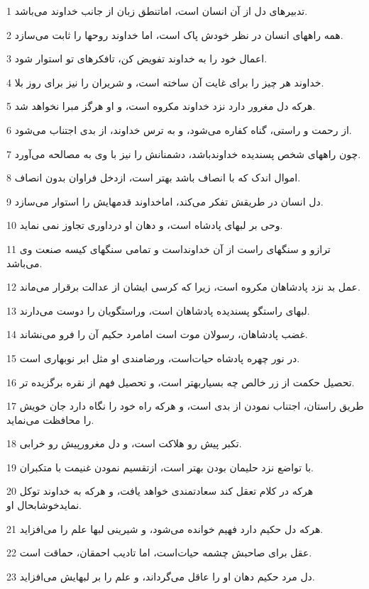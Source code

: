 \par 1 تدبیرهای دل از آن انسان است، اماتنطق زبان از جانب خداوند می‌باشد.
\par 2 همه راههای انسان در نظر خودش پاک است، اما خداوند روحها را ثابت می‌سازد.
\par 3 اعمال خود را به خداوند تفویض کن، تافکرهای تو استوار شود.
\par 4 خداوند هر چیز را برای غایت آن ساخته است، و شریران را نیز برای روز بلا.
\par 5 هر‌که دل مغرور دارد نزد خداوند مکروه است، و او هرگز مبرا نخواهد شد.
\par 6 از رحمت و راستی، گناه کفاره می‌شود، و به ترس خداوند، از بدی اجتناب می‌شود.
\par 7 چون راههای شخص پسندیده خداوندباشد، دشمنانش را نیز با وی به مصالحه می‌آورد.
\par 8 اموال اندک که با انصاف باشد بهتر است، ازدخل فراوان بدون انصاف.
\par 9 دل انسان در طریقش تفکر می‌کند، اماخداوند قدمهایش را استوار می‌سازد.
\par 10 وحی بر لبهای پادشاه است، و دهان او درداوری تجاوز نمی نماید.
\par 11 ترازو و سنگهای راست از آن خداونداست و تمامی سنگهای کیسه صنعت وی می‌باشد.
\par 12 عمل بد نزد پادشاهان مکروه است، زیرا که کرسی ایشان از عدالت برقرار می‌ماند.
\par 13 لبهای راستگو پسندیده پادشاهان است، وراستگویان را دوست می‌دارند.
\par 14 غضب پادشاهان، رسولان موت است امامرد حکیم آن را فرو می‌نشاند.
\par 15 در نور چهره پادشاه حیات‌است، ورضامندی او مثل ابر نوبهاری است.
\par 16 تحصیل حکمت از زر خالص چه بسیاربهتر است، و تحصیل فهم از نقره برگزیده تر.
\par 17 طریق راستان، اجتناب نمودن از بدی است، و هر‌که راه خود را نگاه دارد جان خویش را محافظت می‌نماید.
\par 18 تکبر پیش رو هلاکت است، و دل مغرورپیش رو خرابی.
\par 19 با تواضع نزد حلیمان بودن بهتر است، ازتقسیم نمودن غنیمت با متکبران.
\par 20 هر‌که در کلام تعقل کند سعادتمندی خواهد یافت، و هر‌که به خداوند توکل نمایدخوشابحال او.
\par 21 هر‌که دل حکیم دارد فهیم خوانده می‌شود، و شیرینی لبها علم را می‌افزاید.
\par 22 عقل برای صاحبش چشمه حیات‌است، اما تادیب احمقان، حماقت است.
\par 23 دل مرد حکیم دهان او را عاقل می‌گرداند، و علم را بر لبهایش می‌افزاید.
